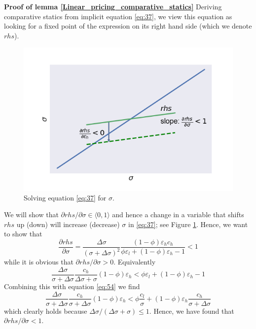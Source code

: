 \documentclass[a4paper,12pt]{article}
\begin{document}
\textbf{Proof of lemma \ref{Linear_pricing_comparative_statics}}
Deriving comparative statics from implicit equation \eqref{eq:37}, we view this equation as looking for a fixed point of the expression on its right hand side (which we denote \(rhs\)).

\begin{figure}[htbp]
\centering
\includegraphics[width=.9\linewidth]{./fixedpoint.png}
\caption{\label{fig:fixedpoint}Solving equation \eqref{eq:37} for \(\sigma\).}
\end{figure}

We will show that \(\partial rhs/\partial \sigma \in \langle 0,1 \rangle\) and hence a change in a variable that shifts \(rhs\) up (down) will increase (decrease) \(\sigma\) in \eqref{eq:37}; see Figure \ref{fig:fixedpoint}. Hence, we want to show that
\begin{equation}
\label{eq:25}
\frac{\partial rhs}{\partial \sigma} = \frac{\Delta \sigma}{(\sigma+\Delta \sigma)^2} \frac{(1-\phi) \varepsilon_h c_h}{\phi \varepsilon_l + (1-\phi) \varepsilon_h -1} < 1
\end{equation}
while it is obvious that \(\partial rhs/\partial \sigma >0\). Equivalently
\begin{equation}
\label{eq:27}
\frac{\Delta \sigma}{\sigma + \Delta \sigma} \frac{c_h}{\Delta \sigma + \sigma}(1-\phi)\varepsilon_h < \phi \varepsilon_l + (1-\phi) \varepsilon_h -1
\end{equation}
Combining this with equation \eqref{eq:54} we find
\begin{equation}
\label{eq:30}
\frac{\Delta \sigma}{\sigma+\Delta \sigma}\frac{c_h}{\sigma+\Delta\sigma}(1-\phi)\varepsilon_h < \phi \frac{c_l}{\sigma}+(1-\phi)\varepsilon_h \frac{c_h}{\sigma+\Delta\sigma}
\end{equation}
which clearly holds because \(\Delta\sigma/(\Delta\sigma+\sigma) \leq 1\). Hence, we have found that \(\partial rhs/\partial \sigma < 1\).
\end{document}
